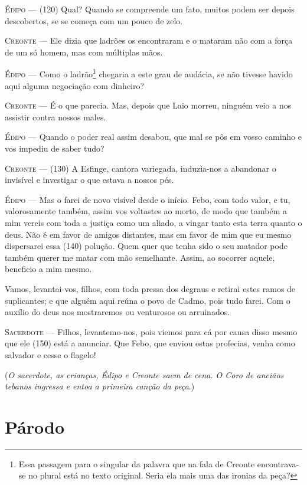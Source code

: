\textsc{Édipo} --- (120) Qual? Quando se compreende um fato, muitos podem ser depois
descobertos, se se começa com um pouco de zelo.

\textsc{Creonte} --- Ele dizia que ladrões os encontraram e o mataram não com a força de um
só homem, mas com múltiplas mãos.

\textsc{Édipo} --- Como o ladrão\footnote{Essa passagem para o singular da palavra que na
  fala de Creonte encontrava-se no plural está no texto original. Seria
  ela mais uma das ironias da peça?} chegaria a este grau de audácia, se
não tivesse havido aqui alguma negociação com dinheiro?

\textsc{Creonte} --- É o que parecia. Mas, depois que Laio morreu, ninguém veio a nos
assistir contra nossos males.

\textsc{Édipo} --- Quando o poder real assim desabou, que mal se pôs em vosso caminho e vos
impediu de saber tudo?

\textsc{Creonte} --- (130) A Esfinge, cantora variegada, induzia-nos a abandonar o invisível
e investigar o que estava a nossos pés.

\textsc{Édipo} --- Mas o farei de novo visível desde o início. Febo, com todo valor, e tu,
valorosamente também, assim vos voltastes ao morto, de modo que também a
mim vereis com toda a justiça como um aliado, a vingar tanto esta terra
quanto o deus. Não é em favor de amigos distantes, mas em favor de mim
que eu mesmo dispersarei essa (140) polução. Quem quer que tenha sido o
seu matador pode também querer me matar com mão semelhante. Assim, ao
socorrer aquele, beneficio a mim mesmo.

Vamos, levantai-vos, filhos, com toda pressa dos degraus e retirai estes
ramos de suplicantes; e que alguém aqui reúna o povo de Cadmo, pois tudo
farei. Com o auxílio do deus nos mostraremos ou venturosos ou
arruinados.

\textsc{Sacerdote} --- Filhos, levantemo-nos, pois viemos para cá por causa disso mesmo que ele
(150) está a anunciar. Que Febo, que enviou estas profecias, venha como
salvador e cesse o flagelo!
\bigskip

(\emph{O sacerdote, as crianças, Édipo e Creonte saem de cena. O Coro de
anciãos tebanos ingressa e entoa a primeira canção da peça}.)


\section{Párodo}


